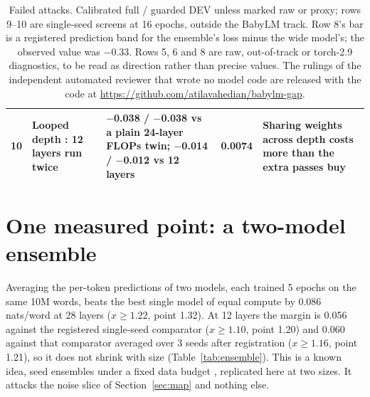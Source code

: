 \documentclass[11pt]{article}
\newcommand{\releaseurl}{\url{https://github.com/atilavahedian/babylm-gap}}
\begin{document}
\begin{table}[t]
\begin{tabularx}{\textwidth}{@{}l>{\raggedright\arraybackslash}p{3.2cm}>{\raggedright\arraybackslash}X l>{\raggedright\arraybackslash}X@{}}
10 & Looped depth \citep{chen2026looped,parcae2026,ouro2025}: 12 layers run twice & $-$0.038 / $-$0.038 vs a plain 24-layer FLOPs twin; $-$0.014 / $-$0.012 vs 12 layers & 0.0074 & Sharing weights across depth costs more than the extra passes buy \\
\bottomrule
\end{tabularx}
\caption{Failed attacks. Calibrated full / guarded DEV unless marked raw or proxy; rows 9--10 are single-seed screens
at 16 epochs, outside the BabyLM track. Row 8's bar is a registered prediction band for the ensemble's loss minus the
wide model's; the observed value was $-$0.33. Rows 5, 6 and 8 are raw,
out-of-track or torch-2.9 diagnostics, to be read as direction rather than precise values. The rulings of the independent automated reviewer that wrote no model code are released with the code at \releaseurl.}
\label{tab:failed}
\end{table}

\section{One measured point: a two-model ensemble}
\label{sec:ensemble}
Averaging the per-token predictions of two models, each trained 5 epochs on the same 10M words, beats the best single
model of equal compute by 0.086 nats/word at 28 layers ($x \geq 1.22$, point 1.32). At 12 layers the margin is 0.056
against the registered single-seed comparator ($x \geq 1.10$, point 1.20) and 0.060 against that comparator averaged
over 3 seeds after registration ($x \geq 1.16$, point 1.21), so it does not shrink with size (Table~\ref{tab:ensemble}). This is a known idea, seed ensembles
under a fixed data budget \citep{lakshminarayanan2017,kim2025infinite}, replicated here at two sizes. It attacks the
noise slice of Section~\ref{sec:map} and nothing else.
\end{document}

